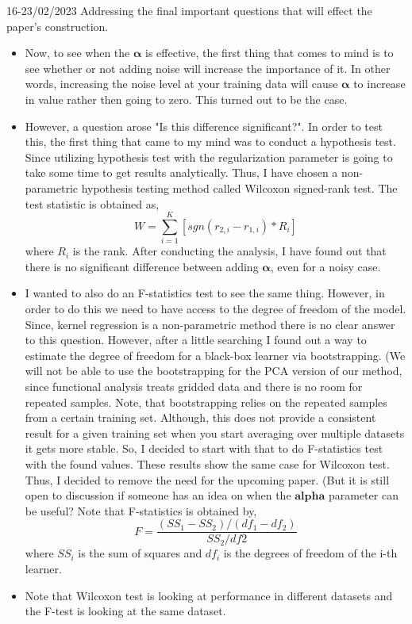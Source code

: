 \documentclass{tran-l}
\theoremstyle{definition}
\theoremstyle{remark}
\numberwithin{equation}{section}
\begin{document}
\color{red}
16-23/02/2023 Addressing the final important questions that will effect the paper's construction.
\begin{itemize}
  \item Now, to see when the $\mathbf{\alpha}$ is effective, the first thing that comes to mind is to see whether or not adding noise will increase the importance of it. In other words, increasing the noise level at your training data will cause $\mathbf{\alpha}$ to increase in value rather then going to zero.  This turned out to be the case.
  \item However, a question arose "Is this difference significant?". In order to test this, the first thing that came to my mind was to conduct a hypothesis test. Since utilizing hypothesis test with the regularization parameter is going to take some time to get results analytically. Thus, I have chosen a non-parametric hypothesis testing method called Wilcoxon signed-rank test. The test statistic is obtained as,
    \begin{equation}
      W = \sum^K_{i=1}[sgn(r_{2,i}-r_{1,i})*R_i]
    \end{equation}
where $R_i$ is the rank. After conducting the analysis, I have found out that there is no significant difference between adding $\mathbf{\alpha}$, even for a noisy case.
  \item I wanted to also do an F-statistics test to see the same thing. However, in order to do this we need to have access to the degree of freedom of the model. Since, kernel regression is a non-parametric method there is no clear answer to this question. However, after a little searching I found out a way to estimate the degree of freedom for a black-box learner via bootstrapping. (We will not be able to use the bootstrapping for the PCA version of our method, since functional analysis treats gridded data and there is no room for repeated samples. Note, that bootstrapping relies on the repeated samples from a certain training set. Although, this does not provide a consistent result for a given training set when you start averaging over multiple datasets it gets more stable. So, I decided to start with that to do F-statistics test with the found values. These results show the same case for Wilcoxon test. Thus, I decided to remove the need for the upcoming paper. (But it is still open to discussion if someone has an idea on when the $\mathbf{alpha}$ parameter can be useful? Note that F-statistics is obtained by,
    \begin{equation}
      F = \frac{(SS_1-SS_2)/(df_1-df_2)}{SS_2/df2}
    \end{equation}
  where $SS_i$ is the sum of squares and $df_i$ is the degrees of freedom of the i-th learner.
  \item Note that Wilcoxon test is looking at performance in different datasets and the F-test is looking at the same dataset.
\end{itemize}
\end{document}
